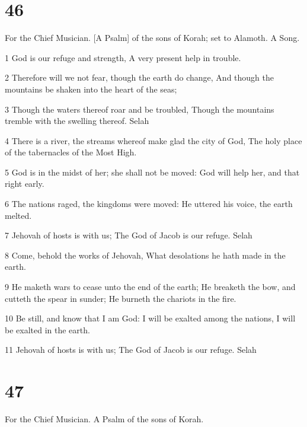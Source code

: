 \chapter{46}

\par For the Chief Musician. [A Psalm] of the sons of Korah; set to Alamoth. A Song.

\par 1 God is our refuge and strength, A very present help in trouble.
\par 2 Therefore will we not fear, though the earth do change, And though the mountains be shaken into the heart of the seas;
\par 3 Though the waters thereof roar and be troubled, Though the mountains tremble with the swelling thereof. Selah
\par 4 There is a river, the streams whereof make glad the city of God, The holy place of the tabernacles of the Most High.
\par 5 God is in the midst of her; she shall not be moved: God will help her, and that right early.
\par 6 The nations raged, the kingdoms were moved: He uttered his voice, the earth melted.
\par 7 Jehovah of hosts is with us; The God of Jacob is our refuge. Selah
\par 8 Come, behold the works of Jehovah, What desolations he hath made in the earth.
\par 9 He maketh wars to cease unto the end of the earth; He breaketh the bow, and cutteth the spear in sunder; He burneth the chariots in the fire.
\par 10 Be still, and know that I am God: I will be exalted among the nations, I will be exalted in the earth.
\par 11 Jehovah of hosts is with us; The God of Jacob is our refuge. Selah

\chapter{47}

\par For the Chief Musician. A Psalm of the sons of Korah.

